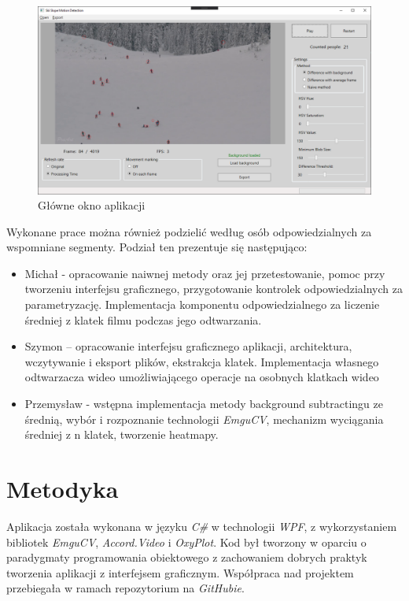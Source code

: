 \documentclass[a4paper]{article}
\begin{document}
\begin{figure}[H]
  \includegraphics[width=\linewidth]{resources/img5.png}
  \caption{Główne okno aplikacji}
\end{figure}
Wykonane prace można również podzielić według osób odpowiedzialnych za wspomniane segmenty. Podział ten prezentuje się następująco: 
\begin{itemize}
\item Michał - opracowanie naiwnej metody oraz jej przetestowanie, pomoc przy tworzeniu interfejsu graficznego, przygotowanie kontrolek odpowiedzialnych za parametryzację. Implementacja komponentu odpowiedzialnego za liczenie średniej z klatek filmu podczas jego odtwarzania. 
\item Szymon – opracowanie interfejsu graficznego aplikacji, architektura, wczytywanie i eksport plików, ekstrakcja klatek. Implementacja własnego odtwarzacza wideo umożliwiającego operacje na osobnych klatkach wideo
\item Przemysław - wstępna implementacja metody background subtractingu ze średnią, wybór i rozpoznanie technologii \textit{EmguCV}, mechanizm wyciągania średniej z n klatek, tworzenie heatmapy.
\end{itemize}

\section{Metodyka}
Aplikacja została wykonana w języku \textit{C\#} w technologii \textit{WPF}, z wykorzystaniem bibliotek \textit{EmguCV}, \textit{Accord.Video} i \textit{OxyPlot}. Kod był tworzony w oparciu o paradygmaty programowania obiektowego z zachowaniem dobrych praktyk tworzenia aplikacji z interfejsem graficznym. Współpraca nad projektem przebiegała w ramach repozytorium na \textit{GitHubie}. 
\end{document}
